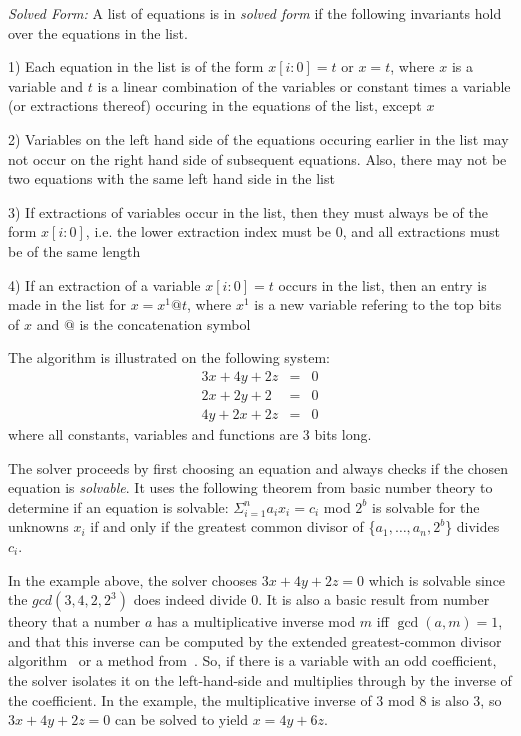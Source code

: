 \begin{definition}
\emph{Solved Form:} A list of equations is in
\textit{solved form} if the following invariants hold over the
equations in the list.

1) Each equation in the list is of the form $x[i:0] = t$ or $x=t$,
where $x$ is a variable and $t$ is a linear combination of the
variables or constant times a variable (or extractions thereof)
occuring in the equations of the list, except $x$

2) Variables on the left hand side of the equations occuring earlier
in the list may not occur on the right hand side of subsequent
equations. Also, there may not be two equations with the same left
hand side in the list

3) If extractions of variables occur in the list, then they must
always be of the form $x[i:0]$, i.e. the lower extraction index must
be 0, and all extractions must be of the same length

4) If an extraction of a variable $x[i:0]= t$ occurs in the list, then
   an entry is made in the list for $x=x^{1}@t$, where $x^1$ is a new
   variable refering to the top bits of $x$ and $@$ is the
   concatenation symbol
\end{definition}

The algorithm is illustrated on the following system:
\begin{eqnarray}
3x + 4y + 2z &=& 0\nonumber\\
2x + 2y + 2 &=& 0 \nonumber\\
4y + 2x + 2z &=& 0\nonumber
\end{eqnarray}
where all constants, variables and functions are 3 bits long. 

The solver proceeds by first choosing an equation and always checks if
the chosen equation is {\it solvable}. It uses the following theorem
from basic number theory to determine if an equation is solvable:
$\Sigma_{i=1}^n a_ix_i = c_i$ mod $2^b$ is solvable for the unknowns
$x_i$ if and only if the greatest common divisor of
\{$a_1,\ldots,a_n,2^b$\} divides $c_i$.

In the example above, the solver chooses $3x + 4y + 2z = 0$ which is
solvable since the $gcd(3,4,2,2^3)$ does indeed divide $0$. It is also
a basic result from number theory that a number $a$ has a
multiplicative inverse mod $m$ iff $\gcd(a, m) = 1$, and that this
inverse can be computed by the extended greatest-common divisor
algorithm~\cite{CLR} or a method from~\cite{BDL98}. So, if there is a
variable with an odd coefficient, the solver isolates it on the
left-hand-side and multiplies through by the inverse of the
coefficient.  In the example, the multiplicative inverse of $3$ mod
$8$ is also $3$, so $3x + 4y + 2z = 0$ can be solved to yield $x = 4y
+ 6z$.

